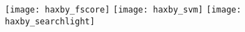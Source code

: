 \documentclass{article} %
\begin{document}
\begin{figure}
\begin{preview}
  \begin{center}
  \texttt{[image: haxby\_fscore]}
  \texttt{[image: haxby\_svm]}
  \texttt{[image: haxby\_searchlight]}
  \end{center}
\end{preview}
\end{figure}
\end{document}
